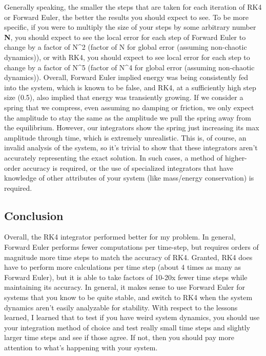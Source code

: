 \documentclass[11pt]{article}
\begin{document}
Generally speaking, the smaller the steps that are taken for each
iteration of RK4 or Forward Euler, the better the results you should
expect to see. To be more specific, if you were to multiply the size of
your steps by some arbitrary number \textbf{N}, you should expect to see
the local error for each step of Forward Euler to change by a factor of
N\^{}2 (factor of N for global error (assuming non-chaotic dynamics)),
or with RK4, you should expect to see local error for each step to
change by a factor of N\^{}5 (factor of N\^{}4 for global error
(assuming non-chaotic dynamics)). Overall, Forward Euler implied energy
was being consistently fed into the system, which is known to be false,
and RK4, at a sufficiently high step size (0.5), also implied that
energy was transiently growing. If we consider a spring that we
compress, even assuming no damping or friction, we only expect the
amplitude to stay the same as the amplitude we pull the spring away from
the equilibrium. However, our integrators show the spring just
increasing its max amplitude through time, which is extremely
unrealistic. This is, of course, an invalid analysis of the system, so
it's trivial to show that these integrators aren't accurately
representing the exact solution. In such cases, a method of higher-order
accuracy is required, or the use of specialized integrators that have
knowledge of other attributes of your system (like mass/energy
conservation) is required.

\subsection{Conclusion}\label{conclusion}

Overall, the RK4 integrator performed better for my problem. In general,
Forward Euler performs fewer computations per time-step, but requires
orders of magnitude more time steps to match the accuracy of RK4.
Granted, RK4 does have to perform more calculations per time step (about
4 times as many as Forward Euler), but it is able to take factors of
10-20x fewer time steps while maintaining its accuracy. In general, it
makes sense to use Forward Euler for systems that you know to be quite
stable, and switch to RK4 when the system dynamics aren't easily
analyzable for stability. With respect to the lessons learned, I learned
that to test if you have weird system dynamics, you should use your
integration method of choice and test really small time steps and
slightly larger time steps and see if those agree. If not, then you
should pay more attention to what's happening with your system.
\end{document}
